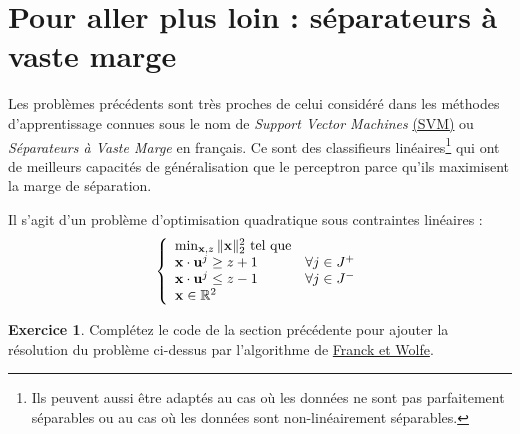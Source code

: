 \documentclass[a4paper,francais]{article}
\newcommand{\R}{{\ensuremath\mathbb{R}}}
\theoremstyle{definition}
\newtheorem{exercice}{Exercice}[section]
\begin{document}
\section{Pour aller plus loin : séparateurs à vaste marge}
\label{sec:svm}

Les problèmes précédents sont très proches de celui considéré dans les
méthodes d'apprentissage connues sous le nom de \emph{Support Vector Machines}
\href{https://en.wikipedia.org/wiki/Support-vector_machine}{(SVM)} ou
\emph{Séparateurs à Vaste Marge} en français. Ce sont des classifieurs
linéaires\footnote{Ils peuvent aussi être adaptés au cas où les données
  ne sont pas parfaitement séparables ou au cas où les données sont
  non-linéairement séparables.} 
qui ont de meilleurs capacités de généralisation que le perceptron 
parce qu'ils maximisent la marge de séparation.

Il s'agit d'un problème d'optimisation quadratique sous contraintes
linéaires : 
\[
\left\{
\begin{array}{ll}
  \min_{\vec{x},z} \|\vec{x}\|_2^2 \ \text{tel que} & \\
  \vec{x} \cdot \vec{u}^j \geq z + 1 & \forall j \in J^+ \\ 
  \vec{x} \cdot \vec{u}^j \leq z - 1 & \forall j \in J^- \\
  \vec{x} \in \R^2
\end{array}
\right.
\]

\begin{exercice}
  Complétez le code de la section précédente pour ajouter la résolution du problème
  ci-dessus par l'algorithme de
  \href{https://en.wikipedia.org/wiki/Frank%E2%80%93Wolfe_algorithm}{Franck et Wolfe}. 
\end{exercice}
\end{document}
